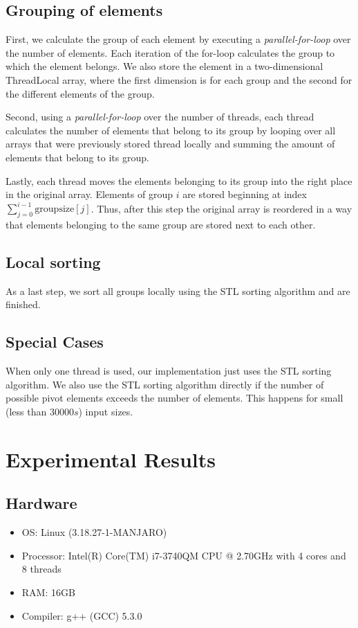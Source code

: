 \documentclass{llncs}
\begin{document}
\subsection{Grouping of elements}
First, we calculate the group of each element by executing a \emph{parallel-for-loop} over the number of elements. Each iteration of the for-loop calculates the group to which the element belongs. We also store the element in a two-dimensional ThreadLocal array, where the first dimension is for each group and the second for the different elements of the group. \par
Second, using a \emph{parallel-for-loop} over the number of threads, each thread calculates the number of elements that belong to its group by looping over all arrays that were previously stored thread locally and summing the amount of elements that belong to its group.  \par
Lastly, each thread moves the elements belonging to its group into the right place in the original array. Elements of group $i$ are stored beginning at index  $\sum_{j=0}^{i-1}\text{groupsize}[j]$. Thus, after this step the original array is reordered in a way that elements belonging to the same group are stored next to each other.
\subsection{Local sorting}
As a last step, we sort all groups locally using the STL sorting algorithm and are finished.
\subsection{Special Cases}
When only one thread is used, our implementation just uses the STL sorting algorithm. We also use the STL sorting algorithm directly if the number of possible pivot elements exceeds the number of elements. This happens for small (less than $30000s$) input sizes.
\section{Experimental Results}
\subsection{Hardware}
\begin{itemize}
	\item OS: Linux (3.18.27-1-MANJARO)
	\item Processor: Intel(R) Core(TM) i7-3740QM CPU @ 2.70GHz with 4 cores and 8 threads
	\item RAM: 16GB
	\item Compiler: g++ (GCC) 5.3.0
\end{itemize}
\end{document}
